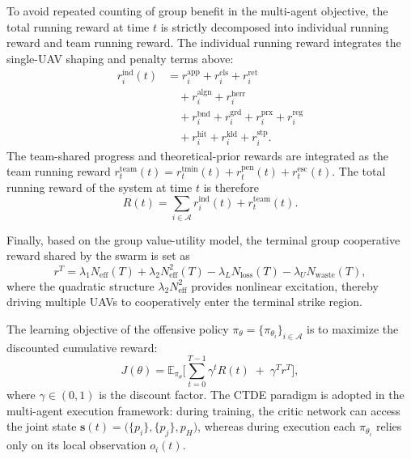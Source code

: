 \documentclass{cja}
\begin{document}
To avoid repeated counting of group benefit in the multi-agent objective, the total running reward at time $t$ is strictly decomposed into individual running reward and team running reward. The individual running reward integrates the single-UAV shaping and penalty terms above:
\begin{equation}
\begin{aligned}
r_i^{\mathrm{ind}}(t)
&=
{r_i^{\mathrm{app}}+r_i^{\mathrm{cls}}+r_i^{\mathrm{ret}}}\\
&\quad
+{r_i^{\mathrm{algn}}+r_i^{\mathrm{herr}}}\\
&\quad
+{r_i^{\mathrm{bnd}}+r_i^{\mathrm{grd}}+r_i^{\mathrm{prx}}+r_i^{\mathrm{reg}}}\\
&\quad
+r_i^{\mathrm{hit}}+r_i^{\mathrm{kld}}+r_i^{\mathrm{stp}}.
\end{aligned}
\label{eq:r-ind}
\end{equation}
The team-shared progress and theoretical-prior rewards are integrated as the team running reward $r_t^{\mathrm{team}}(t)=r_t^{\mathrm{tmin}}(t)+r_t^{\mathrm{pen}}(t)+r_t^{\mathrm{esc}}(t)$. The total running reward of the system at time $t$ is therefore
\begin{equation}
R(t)=\sum_{i\in\mathcal{A}}r_i^{\mathrm{ind}}(t)+r_t^{\mathrm{team}}(t).
\label{eq:r-total}
\end{equation}

Finally, based on the group value-utility model, the terminal group cooperative reward shared by the swarm is set as
\begin{equation}
r^{T}=\lambda_1 N_{\mathrm{eff}}(T)+\lambda_2 N_{\mathrm{eff}}^{2}(T)
-\lambda_L N_{\mathrm{loss}}(T)-\lambda_U N_{\mathrm{waste}}(T),
\label{eq:r-term}
\end{equation}
where the quadratic structure $\lambda_2 N_{\mathrm{eff}}^{2}$ provides nonlinear excitation, thereby driving multiple UAVs to cooperatively enter the terminal strike region.

The learning objective of the offensive policy $\pi_{\theta}=\{\pi_{\theta_i}\}_{i\in\mathcal{A}}$ is to maximize the discounted cumulative reward:
\begin{equation}
J(\theta)=\mathbb{E}_{\pi_\theta}\Biggl[\sum_{t=0}^{T-1}\gamma^{t} R(t)\;+\;\gamma^{T} r^{T}\Biggr],
\label{eq:rl-objective}
\end{equation}
where $\gamma\in(0,1)$ is the discount factor. The CTDE paradigm is adopted in the multi-agent execution framework: during training, the critic network can access the joint state $\bm{s}(t)=\bigl(\{p_i\},\{p_j\},p_H\bigr)$, whereas during execution each $\pi_{\theta_i}$ relies only on its local observation $o_i(t)$.
\end{document}
